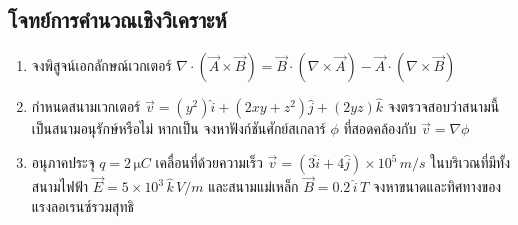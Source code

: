 \subsection{โจทย์การคำนวณเชิงวิเคราะห์}
\begin{enumerate}
    \item จงพิสูจน์เอกลักษณ์เวกเตอร์ $\nabla \cdot (\vec{A} \times \vec{B}) = \vec{B} \cdot (\nabla \times \vec{A}) - \vec{A} \cdot (\nabla \times \vec{B})$
    \item กำหนดสนามเวกเตอร์ $\vec{v} = (y^2)\hat{i} + (2xy + z^2)\hat{j} + (2yz)\hat{k}$ จงตรวจสอบว่าสนามนี้เป็นสนามอนุรักษ์หรือไม่ หากเป็น จงหาฟังก์ชันศักย์สเกลาร์ $\phi$ ที่สอดคล้องกับ $\vec{v} = \nabla \phi$
    \item อนุภาคประจุ $q = 2\,\si{\micro C}$ เคลื่อนที่ด้วยความเร็ว $\vec{v} = (3\hat{i} + 4\hat{j})\times 10^5\,\si{m/s}$ ในบริเวณที่มีทั้งสนามไฟฟ้า $\vec{E} = 5\times 10^3\,\hat{k}\,\si{V/m}$ และสนามแม่เหล็ก $\vec{B} = 0.2\,\hat{i}\,\si{T}$ จงหาขนาดและทิศทางของแรงลอเรนซ์รวมสุทธิ
\end{enumerate}
